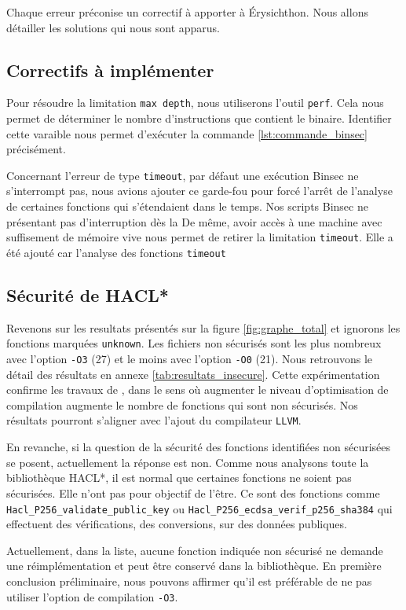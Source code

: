 Chaque erreur préconise un correctif à apporter à Érysichthon. Nous allons détailler les solutions qui nous sont apparus.

\subsection*{Correctifs à implémenter}

Pour résoudre la limitation \texttt{max depth}, nous utiliserons l'outil \texttt{perf}. Cela nous permet de déterminer le nombre d'instructions que contient le binaire. Identifier cette varaible nous permet d'exécuter la commande \ref{lst:commande_binsec} précisément.

Concernant l'erreur de type \texttt{timeout}, par défaut une exécution Binsec ne s'interrompt pas, nous avions ajouter ce garde-fou pour forcé l'arrêt de l'analyse de certaines fonctions qui s'étendaient dans le temps. Nos scripts Binsec ne présentant pas d'interruption dès la 
De même, avoir accès à une machine avec suffisement de mémoire vive nous permet de retirer la limitation \texttt{timeout}. Elle a été ajouté car l'analyse des fonctions \texttt{timeout}



\subsection*{Sécurité de HACL*}

Revenons sur les resultats présentés sur la figure \ref{fig:graphe_total} et ignorons les fonctions marquées \texttt{unknown}. Les fichiers non sécurisés sont les plus nombreux avec l'option \texttt{-O3} (27) et le moins avec l'option \texttt{-O0} (21). Nous retrouvons le détail des résultats en annexe \ref{tab:resultats_insecure}. Cette expérimentation confirme les travaux de \citeauthor{schneider2024breakingbadcompilersbreak}, dans le sens où augmenter le niveau d'optimisation de compilation augmente le nombre de fonctions qui sont non sécurisés. Nos résultats pourront s'aligner avec l'ajout du compilateur \texttt{LLVM}.\smallbreak 

En revanche, si la question de la sécurité des fonctions identifiées non sécurisées se posent, actuellement la réponse est non. Comme nous analysons toute la bibliothèque HACL*, il est normal que certaines fonctions ne soient pas sécurisées. Elle n'ont pas pour objectif de l'être. Ce sont des fonctions comme \texttt{Hacl\_P256\_\-vali\-date\_public\_key} ou \texttt{Hacl\_P256\_\-ecdsa\_\-verif\_p256\_sha384} qui effectuent des vérifications, des conversions, sur des données publiques. 

Actuellement, dans la liste, aucune fonction indiquée non sécurisé ne demande une réimplémentation et peut être conservé dans la bibliothèque. En première conclusion préliminaire, nous pouvons affirmer qu'il est préférable de ne pas utiliser l'option de compilation \texttt{-O3}.


